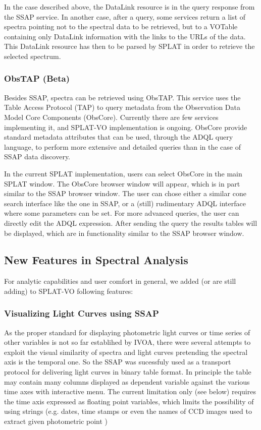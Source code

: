 \documentclass[final,authoryear,5p,times,twocolumn]{elsarticle}
\begin{document}
In the case described above, the DataLink resource is in the query
response from the SSAP service. In another case, after a query, some
services return a list of spectra pointing not to the spectral data to
be retrieved, but to a VOTable containing only DataLink information
with the links to the URLs of the data. This DataLink resource has
then to be parsed by SPLAT in order to retrieve the selected spectrum.

\subsubsection{ObsTAP (Beta)}

Besides SSAP, spectra can be retrieved using ObsTAP. This service uses
the Table Access Protocol (TAP) to query metadata from the Observation
Data Model Core Components (ObsCore). Currently there are few services
implementing it, and SPLAT-VO implementation is ongoing.  ObsCore
provide standard metadata attributes that can be used, through the
ADQL query language, to perform more extensive and detailed queries
than in the case of SSAP data discovery.

In the current SPLAT implementation, users can select ObsCore in the
main SPLAT window. The ObsCore browser window will appear, which is in
part similar to the SSAP browser window. The user can chose either a
similar cone search interface like the one in SSAP, or a (still)
rudimentary ADQL interface where some parameters can be set. For more
advanced queries, the user can directly edit the ADQL
expression. After sending the query the results tables will be
displayed, which are in functionality similar to the SSAP browser
window.

\subsection{New Features in Spectral Analysis}

For analytic capabilities and user comfort in general, we added (or
are still adding) to SPLAT-VO following features:

\subsubsection{Visualizing Light Curves using  SSAP}

As the proper standard for displaying photometric light curves or time
series of other variables is not so far establihed by IVOA, there were
several attempts to exploit the visual similarity of spectra and light
curves pretending the spectral axis is the temporal one.  So the SSAP
was sucessfuly used as a transport protocol for delivering light
curves in binary table format. In principle the table may contain many
columns displayed as dependent variable against the various time axes
with interactive menu.  The current limitation only (see below)
requires the time axis expressed as floating point variables, which
limits the possibility of using strings (e.g. dates, time stamps or
even the names of CCD images used to extract given photometric point )
\end{document}
